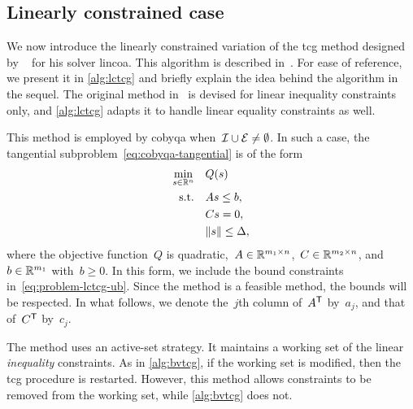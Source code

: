 
\subsection{Linearly constrained case}
\label{subsec:lctcg}

We now introduce the linearly constrained variation of the \gls{tcg} method designed by \citeauthor{Powell_2015}~\cite{Powell_2015} for his solver \gls{lincoa}.
This algorithm is described in~\cite[\S~3,\S~5]{Powell_2015}.
For ease of reference, we present it in \cref{alg:lctcg} and briefly explain the idea behind the algorithm in the sequel.
The original method in~\cite{Powell_2015} is devised for linear inequality constraints only, and \cref{alg:lctcg} adapts it to handle linear equality constraints as well.

This method is employed by \gls{cobyqa} when~$\mathcal{I} \cup \mathcal{E} \neq \emptyset$.
In such a case, the tangential subproblem~\cref{eq:cobyqa-tangential} is of the form
\begin{subequations}
    \label{eq:problem-lctcg}
    \begin{align}
        \min_{\sstep \in \R^n}  & \quad Q(\sstep)\\
        \text{s.t.}             & \quad A \sstep \le b, \label{eq:problem-lctcg-ub}\\
                                & \quad C \sstep = 0,\\
                                & \quad \norm{\sstep} \le \rad,
    \end{align}
\end{subequations}
where the objective function~$Q$ is quadratic,~$A \in \mathbb{R}^{m_1 \times n}$,~$C \in \mathbb{R}^{m_2 \times n}$, and~$b \in \mathbb{R}^{m_1}$ with~$b \ge 0$.
In this form, we include the bound constraints in~\cref{eq:problem-lctcg-ub}.
Since the method is a feasible method, the bounds will be respected.
In what follows, we denote the~$j$th column of~$A^{\mathsf{T}}$ by~$a_j$, and that of~$C^{\mathsf{T}}$ by~$c_j$.

The method uses an active-set strategy.
It maintains a working set of the linear \emph{inequality} constraints.
As in \cref{alg:bvtcg}, if the working set is modified, then the \gls{tcg} procedure is restarted.
However, this method allows constraints to be removed from the working set, while \cref{alg:bvtcg} does not.

